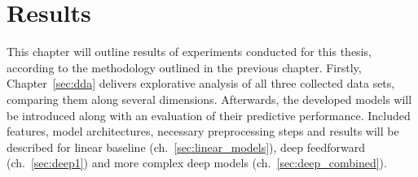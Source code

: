 \section{Results}
\label{ch:results}

This chapter will outline results of experiments conducted for this thesis,
according to the methodology outlined in the previous chapter.
Firstly, Chapter~\ref{sec:dda} delivers explorative analysis of all three
collected data sets, comparing them along several dimensions.
Afterwards, the developed models will be introduced along with an evaluation
of their predictive performance.
Included features, model architectures, necessary preprocessing steps and results will
be described for linear baseline (ch.~\ref{sec:linear_models}),
deep feedforward (ch.~\ref{sec:deep1}) and more complex deep models
(ch.~\ref{sec:deep_combined}).










